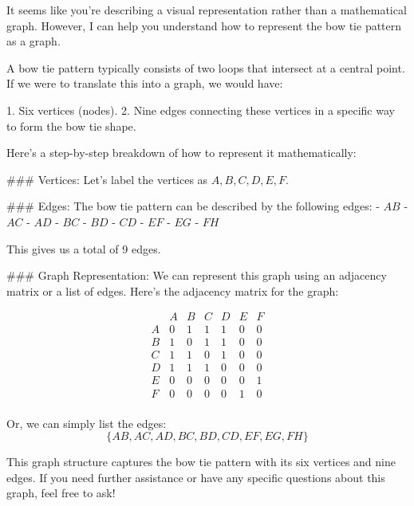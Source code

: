 It seems like you're describing a visual representation rather than a mathematical graph. However, I can help you understand how to represent the bow tie pattern as a graph.

A bow tie pattern typically consists of two loops that intersect at a central point. If we were to translate this into a graph, we would have:

1. Six vertices (nodes).
2. Nine edges connecting these vertices in a specific way to form the bow tie shape.

Here's a step-by-step breakdown of how to represent it mathematically:

### Vertices:
Let's label the vertices as \( A, B, C, D, E, F \).

### Edges:
The bow tie pattern can be described by the following edges:
- \( AB \)
- \( AC \)
- \( AD \)
- \( BC \)
- \( BD \)
- \( CD \)
- \( EF \)
- \( EG \)
- \( FH \)

This gives us a total of 9 edges.

### Graph Representation:
We can represent this graph using an adjacency matrix or a list of edges. Here’s the adjacency matrix for the graph:

\[
\begin{array}{cccccc}
 & A & B & C & D & E & F \\
A & 0 & 1 & 1 & 1 & 0 & 0 \\
B & 1 & 0 & 1 & 1 & 0 & 0 \\
C & 1 & 1 & 0 & 1 & 0 & 0 \\
D & 1 & 1 & 1 & 0 & 0 & 0 \\
E & 0 & 0 & 0 & 0 & 0 & 1 \\
F & 0 & 0 & 0 & 0 & 1 & 0 \\
\end{array}
\]

Or, we can simply list the edges:
\[ \{AB, AC, AD, BC, BD, CD, EF, EG, FH\} \]

This graph structure captures the bow tie pattern with its six vertices and nine edges. If you need further assistance or have any specific questions about this graph, feel free to ask!